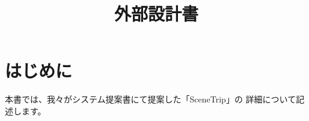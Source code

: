 \documentclass{docs}
\title{外部設計書}
\begin{document}
\section{はじめに}%
本書では、我々がシステム提案書にて提案した「SceneTrip」の
詳細について記述します。
\end{document}
